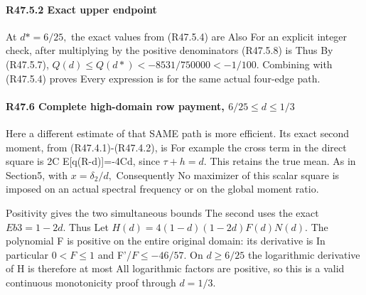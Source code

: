 \paragraph{R47.5.2 Exact upper endpoint}

At \(d*=6/25,\allowbreak \) the exact values from (R47.5.4) are
Also
For an explicit integer check, after multiplying by the positive
denominators (R47.5.8) is
Thus
By (R47.5.7), \(Q(d)\le Q(d*)<-8531/750000<-1/100.\) Combining with (R47.5.4)
proves
Every expression is for the same actual four-edge path.

\paragraph{R47.6 Complete high-domain row payment, \(6/25\le d\le 1/3\)}

Here a different estimate of that SAME path is more efficient. Its exact
second moment, from (R47.4.1)-(R47.4.2), is
For example the cross term in the direct square is
2C E[q(R-d)]=-4Cd, since \(\tau+h=d.\) This retains the true mean.
As in Section5, with \(x=\delta_2/d,\allowbreak \)
Consequently
No maximizer of this scalar square is imposed on an actual spectral
frequency or on the global moment ratio.

Positivity gives the two simultaneous bounds
The second uses the exact \(Eb3=1-2d.\) Thus
Let \(H(d)=4(1-d)(1-2d)F(d)N(d).\) The polynomial F is positive
on the entire original domain: its derivative is
In particular \(0<F\le 1\) and F'/\(F\le -46/57.\) On \(d\ge 6/25\) the logarithmic
derivative of H is therefore at most
All logarithmic factors are positive, so this is a valid continuous
monotonicity proof through \(d=1/3.\)

